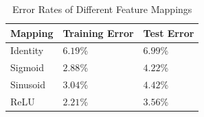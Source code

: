\documentclass{article}
\begin{document}
\begin{table}
    \caption{Error Rates of Different Feature Mappings}
    \label{one-vs-one-mapping-errors}
    \centering
    \begin{tabular}{l|ll}
      \toprule
      Mapping     & Training Error     & Test Error \\
      \midrule
      Identity & $6.19$\%  & $6.99$\%     \\
      Sigmoid     & $2.88$\% & $4.22$\%      \\
      Sinusoid     & $3.04$\%       & $4.42$\%  \\
      ReLU     & $2.21$\%       & $3.56$\%  \\
      \bottomrule
    \end{tabular}
\end{table}

\nocite{*}

\end{document}
